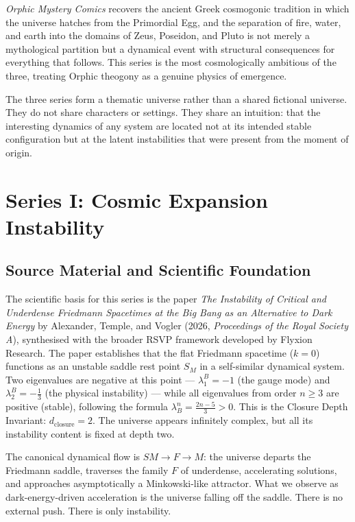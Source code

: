 \documentclass[12pt, a4paper]{article}
\begin{document}
\textit{Orphic Mystery Comics} recovers the ancient Greek cosmogonic tradition in which the universe hatches from the Primordial Egg, and the separation of fire, water, and earth into the domains of Zeus, Poseidon, and Pluto is not merely a mythological partition but a dynamical event with structural consequences for everything that follows. This series is the most cosmologically ambitious of the three, treating Orphic theogony as a genuine physics of emergence.

The three series form a thematic universe rather than a shared fictional universe. They do not share characters or settings. They share an intuition: that the interesting dynamics of any system are located not at its intended stable configuration but at the latent instabilities that were present from the moment of origin.

\newpage
\section{Series I: Cosmic Expansion Instability}

\subsection{Source Material and Scientific Foundation}

The scientific basis for this series is the paper \textit{The Instability of Critical and Underdense Friedmann Spacetimes at the Big Bang as an Alternative to Dark Energy} by Alexander, Temple, and Vogler (2026, \textit{Proceedings of the Royal Society A}), synthesised with the broader RSVP framework developed by Flyxion Research. The paper establishes that the flat Friedmann spacetime ($k=0$) functions as an unstable saddle rest point $S_M$ in a self-similar dynamical system. Two eigenvalues are negative at this point --- $\lambda_1^B = -1$ (the gauge mode) and $\lambda_2^B = -\tfrac{1}{3}$ (the physical instability) --- while all eigenvalues from order $n \geq 3$ are positive (stable), following the formula $\lambda_B^n = \tfrac{2n-5}{3} > 0$. This is the Closure Depth Invariant: $d_{\text{closure}} = 2$. The universe appears infinitely complex, but all its instability content is fixed at depth two.

The canonical dynamical flow is $SM \to F \to M$: the universe departs the Friedmann saddle, traverses the family $F$ of underdense, accelerating solutions, and approaches asymptotically a Minkowski-like attractor. What we observe as dark-energy-driven acceleration is the universe falling off the saddle. There is no external push. There is only instability.
\end{document}
